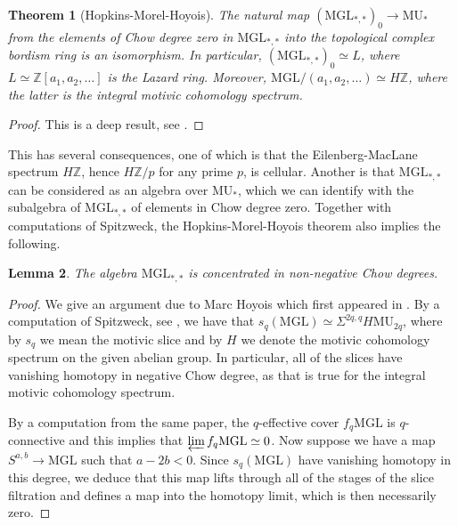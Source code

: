 \documentclass[oneside,a4paper]{amsart}
\newcommand{\MU}{\mathrm{MU}} %
\newcommand{\MGL}{\mathrm{MGL}} %
\theoremstyle{plain}
\newtheorem{thm}{Theorem}[section]
\newtheorem{lemma}[thm]{Lemma}
\theoremstyle{definition}
\theoremstyle{remark}
\begin{document}
\begin{thm}[Hopkins-Morel-Hoyois]
\label{thm:hopkins_morel_conjecture}
The natural map $(\MGL_{*, *}) _{0} \rightarrow \MU_{*}$ from the elements of Chow degree zero in $\MGL_{*, *}$ into the topological complex bordism ring is an isomorphism. In particular, $(\MGL_{*, *}) _{0} \simeq L$, where $L \simeq \mathbb{Z}[a_{1}, a_{2}, \ldots]$ is the Lazard ring. Moreover, $\MGL / (a_{1}, a_{2}, \ldots) \simeq H \mathbb{Z}$, where the latter is the integral motivic cohomology spectrum. 
\end{thm}

\begin{proof}
This is a deep result, see \cite{hoyois2015algebraic}. 
\end{proof}

This has several consequences, one of which is that the Eilenberg-MacLane spectrum $H \mathbb{Z}$, hence $H \mathbb{Z}/p$ for any prime $p$, is cellular. Another is that $\MGL_{*, *}$ can be considered as an algebra over $\MU_{*}$, which we can identify with the subalgebra of $\MGL_{*, *}$ of elements in Chow degree zero. Together with computations of Spitzweck, the Hopkins-Morel-Hoyois theorem also implies the following. 

\begin{lemma}
\label{lemma:mgl_concentrated_in_nonnegative_chow_degree}
The algebra $\MGL_{*, *}$ is concentrated in non-negative Chow degrees. 
\end{lemma}

\begin{proof}
We give an argument due to Marc Hoyois which first appeared in \cite{hoyois_mathoverflow_question}. By a computation of Spitzweck, see \cite{spitzweck2010relations}, we have that $s_{q}(\MGL) \simeq \Sigma^{2q, q} H \MU_{2q}$, where by $s_{q}$ we mean the motivic slice and by $H$ we denote the motivic cohomology spectrum on the given abelian group.  In particular, all of the slices have vanishing homotopy in negative Chow degree, as that is true for the integral motivic cohomology spectrum. 

By a computation from the same paper, the $q$-effective cover $f_{q} \MGL$ is $q$-connective and this implies that $\varprojlim f_{q} \MGL \simeq 0$. Now suppose we have a map $S^{a, b} \rightarrow \MGL$ such that $a - 2b < 0$. Since $s_{q}(\MGL)$ have vanishing homotopy in this degree, we deduce that this map lifts through all of the stages of the slice filtration and defines a map into the homotopy limit, which is then necessarily zero. 
\end{proof}
\end{document}

